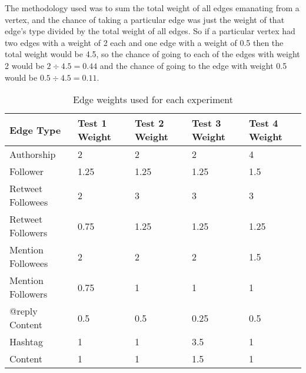 The methodology used was to sum the total weight of all edges emanating from a vertex, and the chance of taking a particular edge was just the weight of that edge's type divided by the total weight of all edges. So if a particular vertex had two edges with a weight of 2 each and one edge with a weight of  0.5 then the total weight would be 4.5, so the chance of going to each of the edges with weight 2 would be $2 \div 4.5 = 0.44$ and the chance of going to the edge with weight 0.5 would be $0.5 \div 4.5 = 0.11$.


\begin{table}
\centering
\begin{tabular}{l|p{1.5cm}|p{1.5cm}|p{1.5cm}|p{1.5cm}}
{\bf Edge Type} & {\bf Test 1 Weight} & {\bf Test 2 Weight} & {\bf Test 3 Weight} & {\bf Test 4 Weight} \\ \hline
Authorship & 2 & 2 & 2 & 4 \\ \hline
Follower & 1.25 & 1.25 & 1.25 & 1.5 \\ \hline
Retweet Followees & 2 & 3 & 3 & 3 \\ \hline
Retweet Followers & 0.75 & 1.25 & 1.25 & 1.25 \\ \hline
Mention Followees & 2 & 2 & 2 & 1.5 \\ \hline
Mention Followers & 0.75 & 1 & 1 & 1 \\ \hline
@reply Content & 0.5 & 0.5 & 0.25 & 0.5 \\ \hline
Hashtag & 1 & 1 & 3.5 & 1 \\ \hline
Content & 1 & 1 & 1.5 & 1 \\
\end{tabular}
\caption{Edge weights used for each experiment }
\label{tab:EdgeWeightsUsed}
\end{table}

